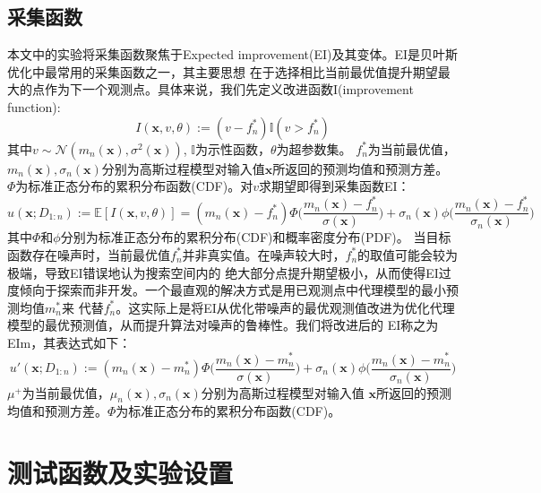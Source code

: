 \documentclass[a4paper,10pt]{article}
\begin{document}
  \subsection{采集函数}
本文中的实验将采集函数聚焦于Expected improvement(EI)及其变体。EI是贝叶斯优化中最常用的采集函数之一，其主要思想
在于选择相比当前最优值提升期望最大的点作为下一个观测点。具体来说，我们先定义改进函数I(improvement function):
\begin{equation}\label{eq1}
\textit{I}(\textbf{x},v,\theta):=(v-f^*_n)\mathbb{I}(v>f^*_n)
\end{equation}
其中$v\sim \mathcal{N}(m_n(\textbf{x}),\sigma^2(\textbf{x}))$, $\mathbb{I}$为示性函数，$\theta$为超参数集。
$f^*_n$为当前最优值，$m_n(\textbf{x}),\sigma_n(\textbf{x})$分别为高斯过程模型对输入值$\textbf{x}$所返回的预测均值和预测方差。
$\Phi$为标准正态分布的累积分布函数(CDF)。对$v$求期望即得到采集函数EI：
\begin{equation}\label{eq1}
u(\textbf{x};D_{1:n}):=\mathbb{E}[\textit{I}(\textbf{x},v,\theta)]=(m_n(\textbf{x})-f^*_n)\Phi \Big(\frac{m_n(\textbf{x})-f^*_n}{\sigma(\textbf{x})}\Big)+\sigma_n(\textbf{x})\phi \Big(\frac{m_n(\textbf{x})-f^*_n}{\sigma_n(\textbf{x})} \Big)
\end{equation}
其中$\Phi$和$\phi$分别为标准正态分布的累积分布(CDF)和概率密度分布(PDF)。
当目标函数存在噪声时，当前最优值$f^*_n$并非真实值。在噪声较大时，$f^*_n$的取值可能会较为极端，导致EI错误地认为搜索空间内的
绝大部分点提升期望极小，从而使得EI过度倾向于探索而非开发。一个最直观的解决方式是用已观测点中代理模型的最小预测均值$m^*_n$来
代替$f^*_n$。这实际上是将EI从优化带噪声的最优观测值改进为优化代理模型的最优预测值，从而提升算法对噪声的鲁棒性。我们将改进后的
EI称之为EIm，其表达式如下：
\begin{equation}\label{eq1}
  u'(\textbf{x};D_{1:n}):=(m_n(\textbf{x})-m^*_n)\Phi \Big(\frac{m_n(\textbf{x})-m^*_n}{\sigma(\textbf{x})}\Big)+\sigma_n(\textbf{x})\phi \Big(\frac{m_n(\textbf{x})-m^*_n}{\sigma_n(\textbf{x})} \Big)
  \end{equation}
  $\mu^+$为当前最优值，$\mu_n(\textbf{x}),\sigma_n(\textbf{x})$分别为高斯过程模型对输入值
  $\textbf{x}$所返回的预测均值和预测方差。$\Phi$为标准正态分布的累积分布函数(CDF)。

\section{测试函数及实验设置}
\end{document}
